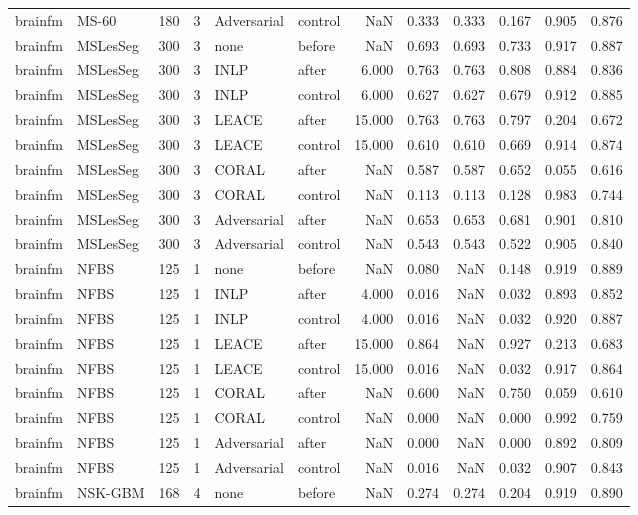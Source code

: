 \begin{tabular}{llrrllrrrrrr}
brainfm & MS-60 & 180 & 3 & Adversarial & control & NaN & 0.333 & 0.333 & 0.167 & 0.905 & 0.876 \\
brainfm & MSLesSeg & 300 & 3 & none & before & NaN & 0.693 & 0.693 & 0.733 & 0.917 & 0.887 \\
brainfm & MSLesSeg & 300 & 3 & INLP & after & 6.000 & 0.763 & 0.763 & 0.808 & 0.884 & 0.836 \\
brainfm & MSLesSeg & 300 & 3 & INLP & control & 6.000 & 0.627 & 0.627 & 0.679 & 0.912 & 0.885 \\
brainfm & MSLesSeg & 300 & 3 & LEACE & after & 15.000 & 0.763 & 0.763 & 0.797 & 0.204 & 0.672 \\
brainfm & MSLesSeg & 300 & 3 & LEACE & control & 15.000 & 0.610 & 0.610 & 0.669 & 0.914 & 0.874 \\
brainfm & MSLesSeg & 300 & 3 & CORAL & after & NaN & 0.587 & 0.587 & 0.652 & 0.055 & 0.616 \\
brainfm & MSLesSeg & 300 & 3 & CORAL & control & NaN & 0.113 & 0.113 & 0.128 & 0.983 & 0.744 \\
brainfm & MSLesSeg & 300 & 3 & Adversarial & after & NaN & 0.653 & 0.653 & 0.681 & 0.901 & 0.810 \\
brainfm & MSLesSeg & 300 & 3 & Adversarial & control & NaN & 0.543 & 0.543 & 0.522 & 0.905 & 0.840 \\
brainfm & NFBS & 125 & 1 & none & before & NaN & 0.080 & NaN & 0.148 & 0.919 & 0.889 \\
brainfm & NFBS & 125 & 1 & INLP & after & 4.000 & 0.016 & NaN & 0.032 & 0.893 & 0.852 \\
brainfm & NFBS & 125 & 1 & INLP & control & 4.000 & 0.016 & NaN & 0.032 & 0.920 & 0.887 \\
brainfm & NFBS & 125 & 1 & LEACE & after & 15.000 & 0.864 & NaN & 0.927 & 0.213 & 0.683 \\
brainfm & NFBS & 125 & 1 & LEACE & control & 15.000 & 0.016 & NaN & 0.032 & 0.917 & 0.864 \\
brainfm & NFBS & 125 & 1 & CORAL & after & NaN & 0.600 & NaN & 0.750 & 0.059 & 0.610 \\
brainfm & NFBS & 125 & 1 & CORAL & control & NaN & 0.000 & NaN & 0.000 & 0.992 & 0.759 \\
brainfm & NFBS & 125 & 1 & Adversarial & after & NaN & 0.000 & NaN & 0.000 & 0.892 & 0.809 \\
brainfm & NFBS & 125 & 1 & Adversarial & control & NaN & 0.016 & NaN & 0.032 & 0.907 & 0.843 \\
brainfm & NSK-GBM & 168 & 4 & none & before & NaN & 0.274 & 0.274 & 0.204 & 0.919 & 0.890 \\

\end{tabular}
